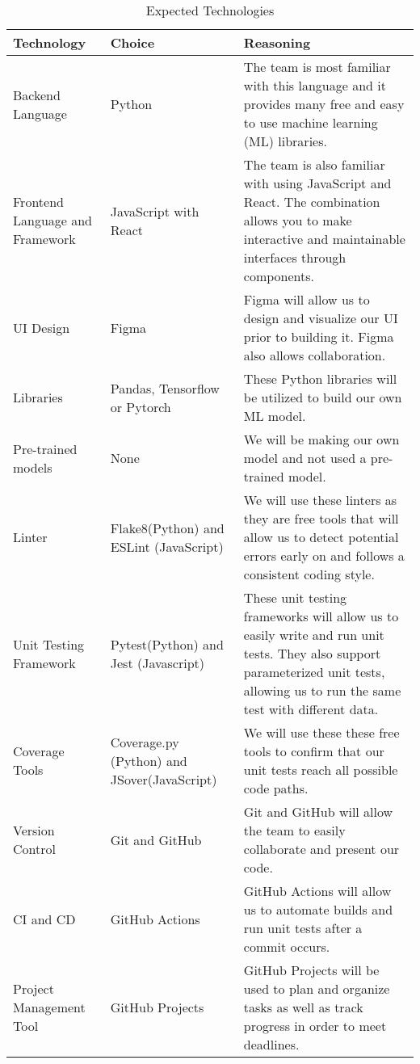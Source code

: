 \documentclass{article}
\begin{document}
\begin{table}[!htbp]
  \centering
  \caption{Expected Technologies}
  \begin{tabular}{|p{4cm}|p{4cm}|p{5cm}|}
  \hline
  \textbf{Technology} & \textbf{Choice} & \textbf{Reasoning} \\ 
  \hline
  Backend Language & Python & The team is most familiar with this language and it provides many free and easy to use machine learning (ML) libraries.\\
  \hline 
  Frontend Language and Framework & JavaScript with React & The team is also familiar with using JavaScript and React. The combination allows you to make interactive and maintainable interfaces through components. \\
  \hline
  UI Design & Figma & Figma will allow us to design and visualize our UI prior to building it. Figma also allows collaboration.\\ 
  \hline
  Libraries & Pandas, Tensorflow or Pytorch & These Python libraries will be utilized to build our own ML model. \\
  \hline
  Pre-trained models & None & We will be making our own model and not used a pre-trained model.\\
  \hline 
  Linter & Flake8(Python) and ESLint (JavaScript) &  We will use these linters as they are free tools that will allow us to detect potential errors early on and follows a consistent coding style. \\
  \hline
  Unit Testing Framework & Pytest(Python) and Jest (Javascript) & These unit testing frameworks will allow us to easily write and run unit tests. \newline They also support parameterized unit tests, allowing us to run the same test with different data. \\
  \hline
  Coverage Tools & Coverage.py (Python) and JSover(JavaScript) & We will use these these free tools to confirm that our unit tests reach all possible code paths.\\
  \hline
  Version Control & Git and GitHub & Git and GitHub will allow the team to easily collaborate and present our code. \\
  \hline 
  CI and CD & GitHub Actions & GitHub Actions will allow us to automate builds and run unit tests after a commit occurs. \\
  \hline 
  Project Management Tool & GitHub Projects & GitHub Projects will be used to plan and organize tasks as well as track progress in order to meet deadlines.\\
  \hline 

\end{tabular}
\end{table}
\end{document}
